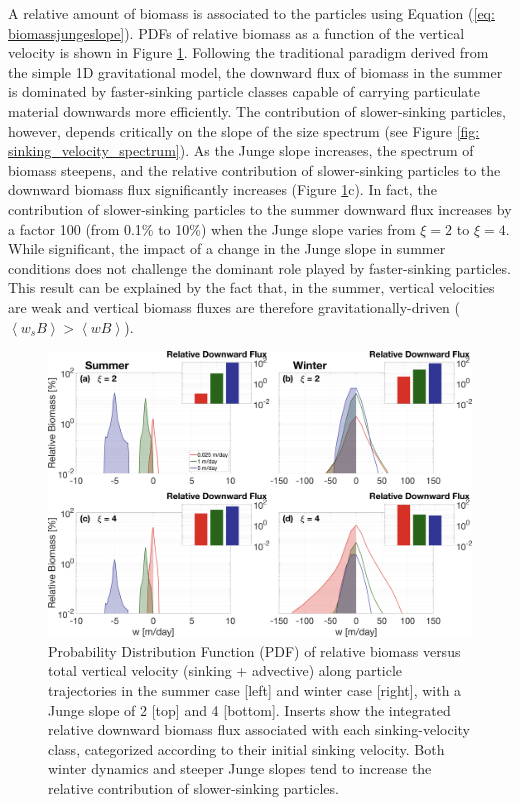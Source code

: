 \documentclass[article,linenumbers]{agujournal2018}
\begin{document}
	A relative amount of biomass is associated to the particles using Equation (\ref{eq: biomassjungeslope}). PDFs of relative biomass as a function of the vertical velocity is shown in Figure \ref{fig: biomass_export}. Following the traditional paradigm derived from the simple 1D gravitational model, the downward flux of biomass in the summer is dominated by faster-sinking particle classes capable of carrying particulate material downwards more efficiently. The contribution of slower-sinking particles, however, depends critically on the slope of the size spectrum (see Figure \ref{fig: sinking_velocity_spectrum}). As the Junge slope increases, the spectrum of biomass steepens, and the relative contribution of slower-sinking particles to the downward biomass flux significantly increases (Figure \ref{fig: biomass_export}c). In fact, the contribution of slower-sinking particles to the summer downward flux increases by a factor 100 (from 0.1\% to 10\%) when the Junge slope varies from $\xi =2$ to $\xi = 4$. While significant, the impact of a change in the Junge slope in summer conditions does not challenge the dominant role played by faster-sinking particles. This result can be explained by the fact that, in the summer, vertical velocities are weak and vertical biomass fluxes are therefore gravitationally-driven ($\left<w_sB\right> > \left<wB\right>$).
	
	\begin{figure}[t]
		\centering
		\includegraphics[width = 1\linewidth]{Fig7.png}
		\caption{Probability Distribution Function (PDF) of relative biomass versus total vertical velocity (sinking + advective) along particle trajectories in the summer case [left] and winter case [right], with a Junge slope of 2 [top] and 4 [bottom]. Inserts show the integrated relative downward biomass flux associated with each sinking-velocity class, categorized according to their initial sinking velocity. Both winter dynamics and steeper Junge slopes tend to increase the relative contribution of slower-sinking particles.}
		\label{fig: biomass_export}
	\end{figure}
	
\end{document}
